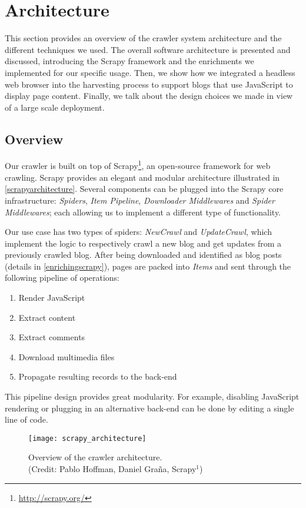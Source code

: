 \section{Architecture}
\label{architecture}

This section provides an overview of the crawler system architecture and the different techniques we used. The overall software architecture is presented and discussed, introducing the Scrapy framework and the enrichments we implemented for our specific usage. Then, we show how we integrated a headless web browser into the harvesting process to support blogs that use JavaScript to display page content. Finally, we talk about the design choices we made in view of a large scale deployment.


\subsection{Overview}

Our crawler is built on top of Scrapy\footnote{\label{scrapy}\url{http://scrapy.org/}}, an open-source framework for web crawling. Scrapy provides an elegant and modular architecture illustrated in \autoref{scrapyarchitecture}. Several components can be plugged into the Scrapy core infrastructure: \emph{Spiders}, \emph{Item Pipeline}, \emph{Downloader Middlewares} and \emph{Spider Middlewares}; each allowing us to implement a different type of functionality.

Our use case has two types of spiders: \emph{NewCrawl} and \emph{UpdateCrawl}, which implement the logic to respectively crawl a new blog and get updates from a previously crawled blog. After being downloaded and identified as blog posts (details in \autoref{enrichingscrapy}), pages are packed into \emph{Items} and sent through the following pipeline of operations:
\begin{enumerate}
  \item Render JavaScript
  \item Extract content
  \item Extract comments
  \item Download multimedia files
  \item Propagate resulting records to the back-end
\end{enumerate}
This pipeline design provides great modularity. For example, disabling JavaScript rendering or plugging in an alternative back-end can be done by editing a single line of code.

\begin{figure}
  \capstart
  \centering
  \texttt{[image: scrapy\_architecture]}
  \caption{Overview of the crawler architecture.\\(Credit: Pablo Hoffman, Daniel Graña, Scrapy$^1$)} %
  \label{scrapyarchitecture}
\end{figure}


